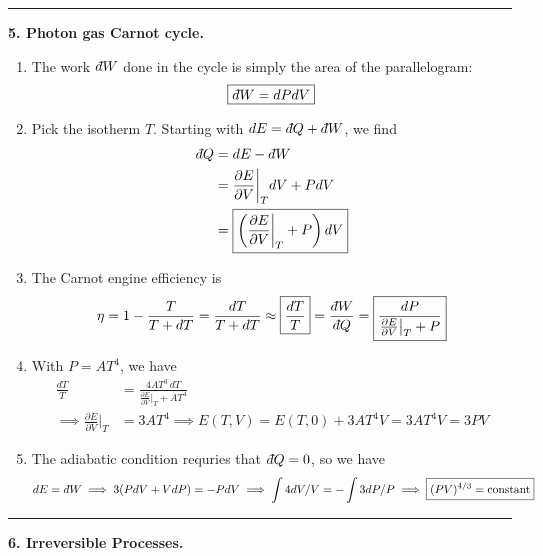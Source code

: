 \documentclass{article}
\theoremstyle{definition}
\newcommand{\p}{\partial}
\def\dbar{{\mkern3mu\mathchar'26\mkern-12mu   d}}
\newcommand{\f}[2]{\frac{#1}{#2}}
\newcommand{\lp}{\left(}
\newcommand{\rp}{\right)}
\begin{document}
\hrule

$\,$\\



\noindent \textbf{5. Photon gas Carnot cycle.} 


\begin{enumerate}[label=(\alph*)]
	\item The work $\dbar W$ done in the cycle is simply the area of the parallelogram:
	\begin{equation*}
	\boxed{\dbar W = dPdV}
	\end{equation*}
	
	
	\item Pick the isotherm $T$. Starting with $dE = \dbar Q + \dbar W$, we find 
	\begin{align*}
	\dbar Q &= dE -  \dbar W \\
	&= \f{\p E}{\p V}\bigg\vert_{T} dV  + PdV \\
	&= \boxed{\lp  \f{\p E}{\p V}\bigg\vert_{T} + P \rp dV}
	\end{align*}
	
	
	\item The Carnot engine efficiency is 
	\begin{equation*}
	\eta = 1 - \f{T}{T+dT} = \f{dT}{T+dT} \approx \boxed{\f{dT}{T}} = \f{\dbar W}{ \dbar Q} = \boxed{\f{dP}{\f{\p E}{\p V}\big\vert_{T} + P }}
	\end{equation*}
	
	
	\item With $P = AT^4$, we have
	\begin{align*}
	\f{dT}{T} &= \f{4AT^3\,dT}{\f{\p E}{\p V}\big\vert_{T} + AT^4 } \\
	\implies \f{\p E}{\p V}\bigg\vert_{T} &= 3AT^4  \implies \boxed{E(T,V)} = E(T,0) + 3AT^4V = \boxed{3AT^4 V} = 3PV
	\end{align*}
	
	
	\item The adiabatic condition requries that $\dbar Q =0$, so we have
	\begin{equation*}
	dE = \dbar W \implies 3(PdV + VdP) = -PdV \implies \int 4dV/V = -\int 3dP/P \implies  \boxed{(PV)^{4/3} = \text{constant}}
	\end{equation*}
\end{enumerate}


\hrule

$\,$\\



\noindent \textbf{6. Irreversible Processes.}
\end{document}
